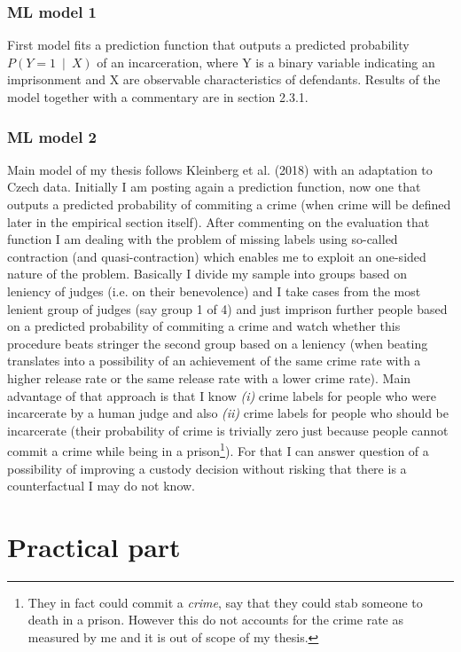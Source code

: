 \documentclass[12pt, twoside,openany]{book} %
\begin{document}
\subsection{ML model 1}
First model fits a prediction function that outputs a predicted probability $P(Y=1~\mid~ X)$ of an incarceration, where Y is a binary variable indicating an imprisonment and X are observable characteristics of defendants. Results of the model together with a commentary are in section 2.3.1.

\subsection{ML model 2}
Main model of my thesis follows Kleinberg et al. (2018) with an adaptation to Czech data. Initially I am posting again a prediction function, now one that outputs a predicted probability of commiting a crime (when crime will be defined later in the empirical section itself). After commenting on the evaluation that function I am dealing with the problem of missing labels using so-called contraction (and quasi-contraction) which enables me to exploit an one-sided nature of the problem. Basically I divide my sample into groups based on leniency of judges (i.e. on their benevolence) and I take cases from the most lenient group of judges (say group 1 of 4) and just imprison further people based on a predicted probability of commiting a crime and watch whether this procedure beats stringer the second group based on a leniency (when beating translates into a possibility of an achievement of the same crime rate with a higher release rate or the same release rate with a lower crime rate). Main advantage of that approach is that I know \textit{(i)} crime labels for people who were incarcerate by a human judge and also \textit{(ii)} crime labels for people who should be incarcerate (their probability of crime is trivially zero just because people cannot commit a crime while being in a prison\footnote{They in fact could commit a \textit{crime}, say that they could stab someone to death in a prison. However this do not accounts for the crime rate as measured by me and it is out of scope of my thesis.}). For that I can answer question of a possibility of improving a custody decision without risking that there is a counterfactual I may do not know. \newline






\chapter{Practical part}        %
\label{2}
\end{document}
